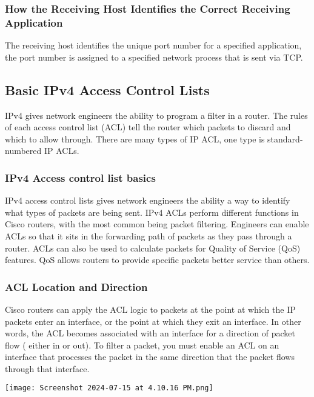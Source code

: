 \documentclass[a4paper]{article}
\begin{document}
    \subsubsection{How the Receiving Host Identifies the Correct Receiving Application}
    The receiving host identifies the unique port number for a specified application, the port number is assigned to a specified network process that is sent via TCP. 

    \subsection{Basic IPv4 Access Control Lists}
    IPv4 gives network engineers the ability to program a filter in a router. The rules of each access control list (ACL) tell the router which packets to discard and which to allow through. There are many types of IP ACL, one type is standard-numbered IP ACLs. 

    \subsubsection{IPv4 Access control list basics}
    IPv4 access control lists gives network engineers the ability a way to identify what types of packets are being sent. IPv4 ACLs perform different functions in Cisco routers, with the most common being packet filtering. Engineers can enable ACLs so that it sits in the forwarding path of packets as they pass through a router. ACLs can also be used to calculate packets for Quality of Service (QoS) features. QoS allows routers to provide specific packets better service than others. 

    \subsubsection{ACL Location and Direction}
    Cisco routers can apply the ACL logic to packets at the point at which the IP packets enter an interface, or the point at which they exit an interface. In other words, the ACL becomes associated with an interface for a direction of packet flow ( either in or out). To filter a packet, you must enable an ACL on an interface that processes the packet in the same direction that the packet flows through that interface. 

    \texttt{[image: Screenshot 2024-07-15 at 4.10.16 PM.png]}
\end{document}
